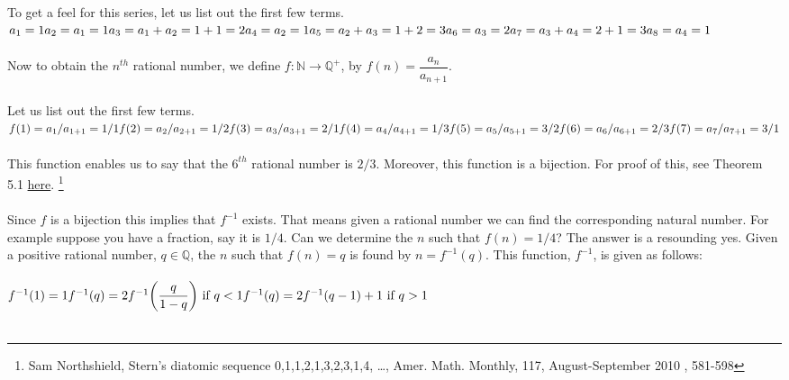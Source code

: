 \documentclass[12pt]{article}
\begin{document}
\noindent To get a feel for this series, let us list out the first few terms. \\ 

\noindent $a_{1}=1 \\ 
a_{2}=a_{1}=1 \\
a_{3}=a_{1}+a_{2}=1+1=2 \\
a_{4}=a_{2}=1 \\
a_{5}=a_{2}+a_{3}=1+2=3 \\
a_{6}=a_{3}=2 \\
a_{7}=a_{3}+a_{4}=2+1=3 \\
a_{8}=a_{4}=1$ \\ \\

\noindent Now to obtain the $n^{th}$ rational number, we define $f: \mathbb{N} \rightarrow \mathbb{Q}^{+}$, by $f(n)= \dfrac{a_{n}}{a_{n+1}}$. \\ \\

Let us list out the first few terms. \\ 

\noindent $f(1)= a_{1}/a_{1+1} = 1/1 \\
f(2)= a_{2}/a_{2+1} = 1/2 \\
f(3)= a_{3}/a_{3+1} = 2/1 \\
f(4)= a_{4}/a_{4+1} = 1/3 \\
f(5)= a_{5}/a_{5+1} = 3/2 \\ 
f(6)= a_{6}/a_{6+1} = 2/3 \\
f(7)= a_{7}/a_{7+1} = 3/1 $ \\ \\

This function enables us to say that the $6^{th}$ rational number is $2/3$. Moreover, this function is a bijection. For proof of this, see Theorem 5.1 \href{http://faculty.plattsburgh.edu/sam.northshield/08-0412.pdf}{here}. \footnote{Sam Northshield, Stern's diatomic sequence 0,1,1,2,1,3,2,3,1,4, \ldots , Amer. Math. Monthly, 117, August-September 2010 , 581-598} \\ \\

Since $f$ is a bijection this implies that $f^{-1}$ exists. That means given a rational number we can find the corresponding natural number. For example suppose you have a fraction, say it is $1/4$. Can we determine the $n$ such that $f(n)=1/4$? The answer is a resounding yes. Given a positive rational number, $q \in \mathbb{Q}$, the $n$ such that $f(n)=q$ is found by $n=f^{-1}(q)$. This function, $f^{-1}$, is given as follows: \\ \\
$f^{-1}(1)=1 \\
f^{-1}(q)= 2f^{-1} \bigg(\dfrac{q}{1-q} \bigg) ~ \text{if} ~ q<1 \\
f^{-1}(q) = 2f^{-1}(q-1)+1 ~\text{if}~ q>1$ \\ \\
\end{document}
